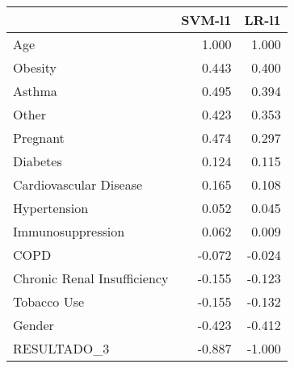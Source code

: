 \begin{tabular}{lrr}
\toprule
{} &  SVM-l1 &  LR-l1 \\
\midrule
Age                         &   1.000 &  1.000 \\
Obesity                     &   0.443 &  0.400 \\
Asthma                      &   0.495 &  0.394 \\
Other                       &   0.423 &  0.353 \\
Pregnant                    &   0.474 &  0.297 \\
Diabetes                    &   0.124 &  0.115 \\
Cardiovascular Disease      &   0.165 &  0.108 \\
Hypertension                &   0.052 &  0.045 \\
Immunosuppression           &   0.062 &  0.009 \\
COPD                        &  -0.072 & -0.024 \\
Chronic Renal Insufficiency &  -0.155 & -0.123 \\
Tobacco Use                 &  -0.155 & -0.132 \\
Gender                      &  -0.423 & -0.412 \\
RESULTADO\_3                 &  -0.887 & -1.000 \\
\bottomrule
\end{tabular}
